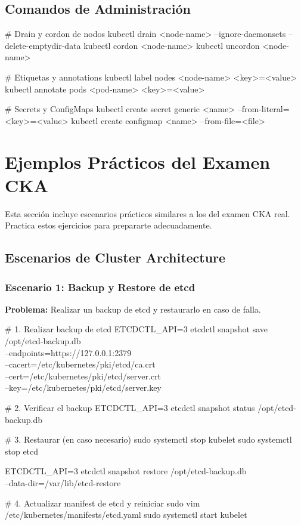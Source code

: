 \documentclass[11pt,a4paper]{article}
\begin{document}
\subsection{Comandos de Administración}

\begin{commandbox}
\# Drain y cordon de nodos
kubectl drain <node-name> --ignore-daemonsets --delete-emptydir-data
kubectl cordon <node-name>
kubectl uncordon <node-name>

\# Etiquetas y annotations
kubectl label nodes <node-name> <key>=<value>
kubectl annotate pods <pod-name> <key>=<value>

\# Secrets y ConfigMaps
kubectl create secret generic <name> --from-literal=<key>=<value>
kubectl create configmap <name> --from-file=<file>
\end{commandbox}

\newpage

\section{Ejemplos Prácticos del Examen CKA}

\begin{warningbox}
Esta sección incluye escenarios prácticos similares a los del examen CKA real. Practica estos ejercicios para prepararte adecuadamente.
\end{warningbox}

\subsection{Escenarios de Cluster Architecture}

\subsubsection{Escenario 1: Backup y Restore de etcd}

\textbf{Problema:} Realizar un backup de etcd y restaurarlo en caso de falla.

\begin{commandbox}
\# 1. Realizar backup de etcd
ETCDCTL\_API=3 etcdctl snapshot save /opt/etcd-backup.db \\
  --endpoints=https://127.0.0.1:2379 \\
  --cacert=/etc/kubernetes/pki/etcd/ca.crt \\
  --cert=/etc/kubernetes/pki/etcd/server.crt \\
  --key=/etc/kubernetes/pki/etcd/server.key

\# 2. Verificar el backup
ETCDCTL\_API=3 etcdctl snapshot status /opt/etcd-backup.db

\# 3. Restaurar (en caso necesario)
sudo systemctl stop kubelet
sudo systemctl stop etcd

ETCDCTL\_API=3 etcdctl snapshot restore /opt/etcd-backup.db \\
  --data-dir=/var/lib/etcd-restore

\# 4. Actualizar manifest de etcd y reiniciar
sudo vim /etc/kubernetes/manifests/etcd.yaml
sudo systemctl start kubelet
\end{commandbox}
\end{document}

